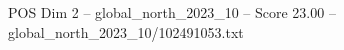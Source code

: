 \begin{textsample}{POS Dim 2 – global\_north\_2023\_10 – Score 23.00 – global\_north\_2023\_10/102491053.txt}
\end{textsample}
